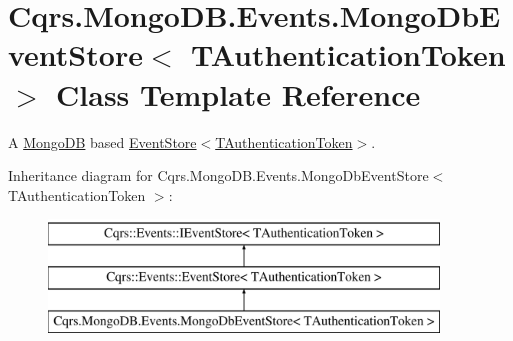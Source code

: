 \hypertarget{classCqrs_1_1MongoDB_1_1Events_1_1MongoDbEventStore}{}\section{Cqrs.\+Mongo\+D\+B.\+Events.\+Mongo\+Db\+Event\+Store$<$ T\+Authentication\+Token $>$ Class Template Reference}
\label{classCqrs_1_1MongoDB_1_1Events_1_1MongoDbEventStore}


A \hyperlink{namespaceCqrs_1_1MongoDB}{Mongo\+DB} based \hyperlink{classCqrs_1_1Events_1_1EventStore_a6346cb2aea4c5b4e740dc6cfb15abab8_a6346cb2aea4c5b4e740dc6cfb15abab8}{Event\+Store$<$\+T\+Authentication\+Token$>$}.  


Inheritance diagram for Cqrs.\+Mongo\+D\+B.\+Events.\+Mongo\+Db\+Event\+Store$<$ T\+Authentication\+Token $>$\+:\begin{figure}[H]
\begin{center}
\leavevmode
\includegraphics[height=3.000000cm]{classCqrs_1_1MongoDB_1_1Events_1_1MongoDbEventStore}
\end{center}
\end{figure}
